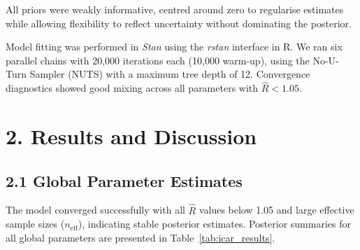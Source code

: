\documentclass[11pt]{article}
\begin{document}
	\vspace{1em}
	
	All priors were weakly informative, centred around zero to regularise estimates while allowing flexibility to reflect uncertainty without dominating the posterior.
	
	Model fitting was performed in \textit{Stan} using the \textit{rstan} interface in R. We ran six parallel chains with 20,000 iterations each (10,000 warm-up), using the No-U-Turn Sampler (NUTS) with a maximum tree depth of 12. Convergence diagnostics showed good mixing across all parameters with $\hat{R} < 1.05$.
	
	\newpage
	\section*{2. Results and Discussion}
	
	\subsection*{2.1 Global Parameter Estimates}
	
	The model converged successfully with all $\hat{R}$ values below 1.05 and large effective sample sizes ($n_{\text{eff}}$), indicating stable posterior estimates. Posterior summaries for all global parameters are presented in Table~\ref{tab:icar_results}. 
	
\end{document}
